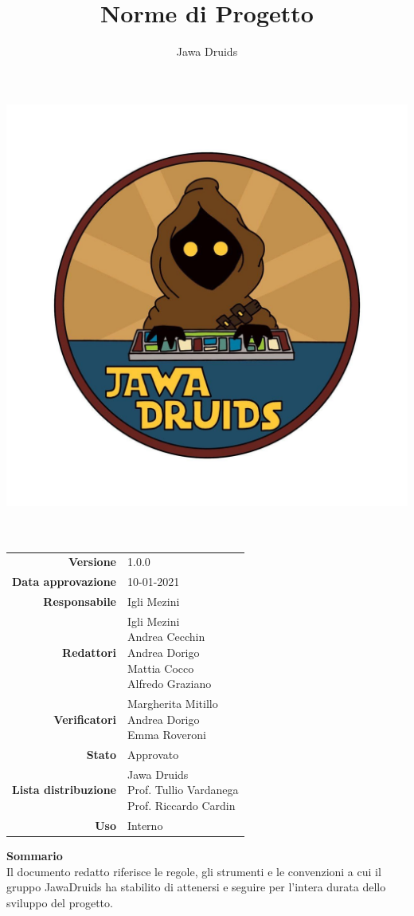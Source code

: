 



\makeatletter
\begin{titlepage}
	\begin{center}
		\vspace*{-5cm}
		\author{Jawa Druids} 
		\title{Norme di Progetto}
		\date{} %
		\includegraphics[width=0.5\linewidth]{../immagini/DRUIDSLOGO.jpg}\\[4ex]
		{\huge \bfseries  \@title }\\[2ex] 
		{\LARGE  \@author}\\[50ex]
		\vspace*{-9cm}
		\begin{table}[H]
			\renewcommand{\arraystretch}{1.4}
			\centering
			\begin{tabular}{r | l}
				\textbf{Versione} & 1.0.0 \\%
				\textbf{Data approvazione} & 10-01-2021\\
				\textbf{Responsabile} & Igli Mezini \\
				\textbf{Redattori} & \makecell[tl]{Igli Mezini \\ Andrea Cecchin \\ Andrea Dorigo \\ Mattia Cocco \\ Alfredo Graziano} \\		
				\textbf{Verificatori} & \makecell[tl]{Margherita Mitillo \\ Andrea Dorigo \\ Emma Roveroni} \\
				\textbf{Stato} & Approvato\\
				\textbf{Lista distribuzione} & \makecell[tl]{Jawa Druids \\ Prof. Tullio Vardanega \\ Prof. Riccardo Cardin}\\
				\textbf{Uso} & Interno     
			\end{tabular}
		\end{table}
		\vspace{0.1cm}
		\hfill \break
		\fontsize{17}{10}\textbf{Sommario} \\
		\vspace{0.1cm}
		Il documento redatto riferisce le regole, gli strumenti e le convenzioni a cui il gruppo JawaDruids ha stabilito di attenersi e seguire per l'intera durata dello sviluppo del progetto.
	\end{center}
\end{titlepage}
